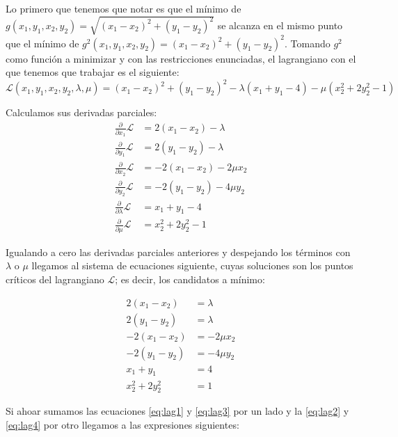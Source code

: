 \documentclass[a4paper, 11pt]{article}
\begin{document}
    \begin{solucion}
        Lo primero que tenemos que notar es que el mínimo de $g(x_1, y_1, x_2, y_2) =  \sqrt{(x_1-x_2)^2+(y_1-y_2)^2}$ se alcanza en el mismo punto que el mínimo de $g^2(x_1, y_1, x_2, y_2) =  (x_1-x_2)^2+(y_1-y_2)^2$. Tomando $g^2$ como función a minimizar y con las restricciones enunciadas, el lagrangiano con el que tenemos que trabajar es el siguiente:
        \[
        \mathcal{L}(x_1, y_1, x_2, y_2, \lambda, \mu) = (x_1-x_2)^2 + (y_1-y_2)^2 - \lambda (x_1+y_1-4) - \mu (x_2^2+2y_2^2-1)
        \]

        Calculamos sus derivadas parciales:
        \begin{align*}
            \frac{\partial}{\partial x_1} \mathcal{L} &= 2(x_1 - x_2) - \lambda \\
            \frac{\partial}{\partial y_1} \mathcal{L} &= 2(y_1 - y_2) - \lambda \\
            \frac{\partial}{\partial x_2} \mathcal{L} &= -2(x_1 - x_2) - 2\mu x_2 \\
            \frac{\partial}{\partial y_2} \mathcal{L} &= -2(y_1 - y_2) - 4\mu y_2 \\
            \frac{\partial}{\partial \lambda} \mathcal{L} &= x_1 + y_1 - 4 \\
            \frac{\partial}{\partial \mu} \mathcal{L} &= x_2^2 + 2y_2^2 - 1
        \end{align*}

        Igualando a cero las derivadas parciales anteriores y despejando los términos con $\lambda$ o $\mu$ llegamos al sistema de ecuaciones siguiente, cuyas soluciones son los puntos críticos del lagrangiano $\mathcal{L}$; es decir, los candidatos a mínimo:

        \begin{align}
            2(x_1 - x_2) &= \lambda \label{eq:lag1}\\
            2(y_1 - y_2) &= \lambda \label{eq:lag2}\\
            -2(x_1 - x_2) &= - 2\mu x_2 \label{eq:lag3}\\
            -2(y_1 - y_2) &= - 4\mu y_2 \label{eq:lag4}\\
            x_1 + y_1 &= 4 \label{eq:lag5}\\
            x_2^2 + 2y_2^2 &= 1 \label{eq:lag6}
        \end{align}

        Si ahoar sumamos las ecuaciones \ref{eq:lag1} y \ref{eq:lag3} por un lado y la \ref{eq:lag2} y \ref{eq:lag4} por otro llegamos a las expresiones siguientes:


\end{solucion}
\end{document}
